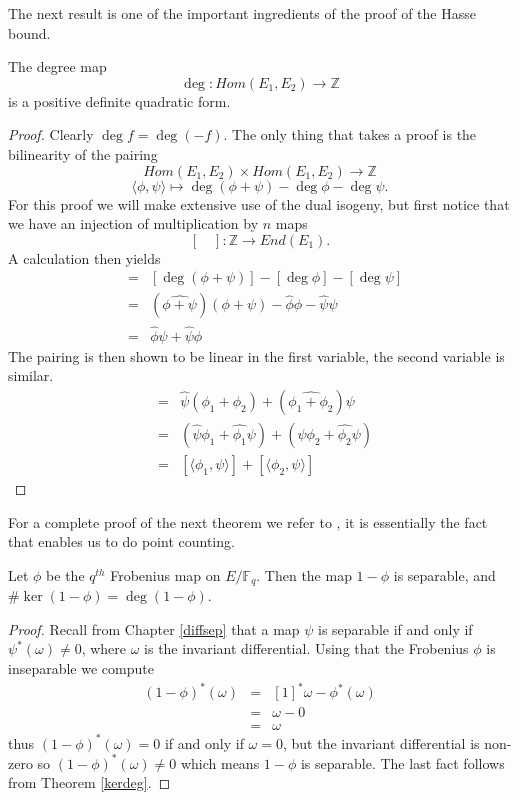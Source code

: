 The next result is one of the important ingredients of the proof of the Hasse bound.
\begin{prop}
 The degree map
$$ \deg: Hom(E_1, E_2) \rightarrow \mathbb{Z} $$
is a positive definite quadratic form.
\end{prop}
\begin{proof}
 Clearly $\deg f = \deg(-f)$. The only thing that takes a proof is the
bilinearity of the pairing
$$ Hom(E_1, E_2) \times Hom(E_1, E_2) \rightarrow \mathbb{Z}$$
$$ \langle \phi, \psi \rangle \mapsto \deg(\phi + \psi) - \deg\phi - \deg\psi. $$
For this proof we will make extensive use of the dual isogeny, but first
notice that we have an injection of multiplication by $n$ maps
$$ [\quad]: \mathbb{Z} \rightarrow End(E_1). $$
A calculation then yields 
\begin{eqnarray*} 
 [\langle \phi,\psi \rangle] &=& [\deg(\phi+\psi)]-[\deg\phi]-[\deg\psi] \nonumber \\
               &=& (\widehat{\phi+\psi})(\phi+\psi) - \widehat{\phi}\phi - \widehat{\psi}\psi \nonumber \\
	       &=& \widehat{\phi}\psi + \widehat{\psi}\phi
\end{eqnarray*}
The pairing is then shown to be linear in the first variable, the second variable is
similar.
\begin{eqnarray*}
 [\langle \phi_1+\phi_2, \psi \rangle] &=& \widehat{\psi}(\phi_1+\phi_2) + (\widehat{\phi_1+\phi_2})\psi \nonumber \\
			 &=& (\widehat{\psi}\phi_1+\widehat{\phi_1}\psi) + (\widehat{\psi}\phi_2 + \widehat{\phi_2}\psi) \nonumber \\
			 &=& [\langle \phi_1,\psi \rangle] + [\langle \phi_2,\psi \rangle] 
\end{eqnarray*}
\end{proof}

For a complete proof of the next theorem we refer to \cite{AEC}, it is essentially the fact that enables
us to do point counting.

\begin{thm} \label{frobkernel}
 Let $\phi$ be the $q^{th}$ Frobenius map on $E/\mathbb{F}_q$. Then the map $1-\phi$ is separable, and
$\#\ker(1-\phi) = \deg(1-\phi)$.
\end{thm}
\begin{proof}
  Recall from Chapter \ref{diffsep} that a map $\psi$ is separable if and only if $\psi^*(\omega) \neq 0$,
where $\omega$ is the invariant differential. Using that the Frobenius $\phi$ is inseparable \cite{AEC}
we compute
\begin{eqnarray}
 (1-\phi)^*(\omega) &=& [1]^*\omega - \phi^*(\omega) \nonumber \\
		    &=& \omega - 0 \nonumber \\
		    &=& \omega \nonumber
\end{eqnarray}
thus $(1-\phi)^*(\omega) = 0$ if and only if $\omega = 0$, but the invariant differential is non-zero
so $(1-\phi)^*(\omega) \neq 0$ which means $1-\phi$ is separable. The last fact follows
from Theorem \ref{kerdeg}.
\end{proof}


